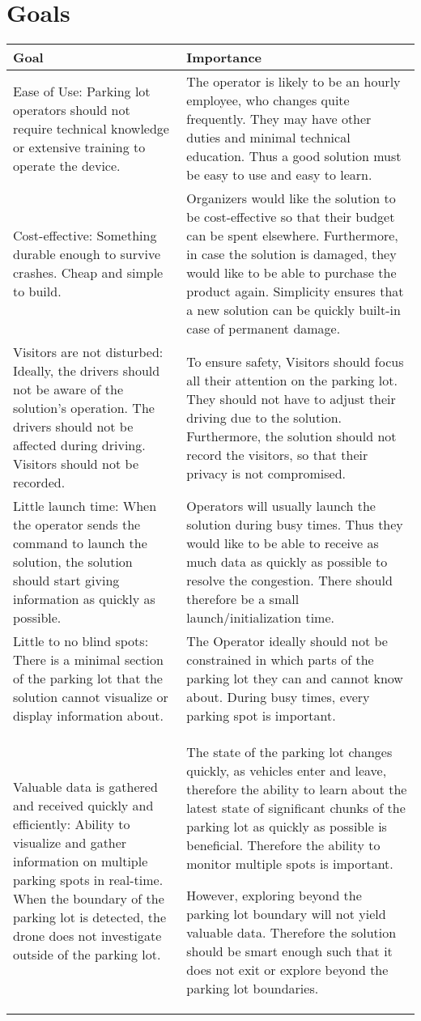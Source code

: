 \documentclass{article}
\begin{document}
\section{Goals}
\begin{tabular}{ | m{7cm} | m{7cm} | } 
  \hline
  Goal & Importance \\ 
  \hline
  Ease of Use: Parking lot operators should not require technical knowledge or extensive training to operate the device.
& The operator is likely to be an hourly employee, who changes quite frequently. They may have other duties and minimal technical education. Thus a good solution must be easy to use and easy to learn. 
  \\ 
  \hline
  Cost-effective: Something durable enough to survive crashes. Cheap and simple to build.
 & Organizers would like the solution to be cost-effective so that their budget can be spent elsewhere. Furthermore, in case the solution is damaged, they would like to be able to purchase the product again. Simplicity ensures that a new solution can be quickly built-in case of permanent damage. 
 \\ 
  \hline
  Visitors are not disturbed: Ideally, the drivers should not be aware of the solution's operation. The drivers should not be affected during driving. Visitors should not be recorded. 
 & To ensure safety, Visitors should focus all their attention on the parking lot. They should not have to adjust their driving due to the solution. Furthermore, the solution should not record the visitors, so that their privacy is not compromised.
 \\ 
  \hline
  Little launch time: When the operator sends the command to launch the solution, the solution should start giving information as quickly as possible. 
 & Operators will usually launch the solution during busy times. Thus they would like to be able to receive as much data as quickly as possible to resolve the congestion. There should therefore be a small launch/initialization time.
 \\ 
  \hline
  Little to no blind spots: There is a minimal section of the parking lot that the solution cannot visualize or display information about.
 & The Operator ideally should not be constrained in which parts of the parking lot they can and cannot know about. During busy times, every parking spot is important.
 \\ 
  \hline
    Valuable data is gathered and received quickly and efficiently: Ability to visualize and gather information on multiple parking spots in real-time. When the boundary of the parking lot is detected, the drone does not investigate outside of the parking lot. 
 & The state of the parking lot changes quickly, as vehicles enter and leave, therefore the ability to learn about the latest state of significant chunks of the parking lot as quickly as possible is beneficial. Therefore the ability to monitor multiple spots is important.

However, exploring beyond the parking lot boundary will not yield valuable data. Therefore the solution should be smart enough such that it does not exit or explore beyond the parking lot boundaries.
 \\ 
  \hline
\end{tabular}
\end{document}

